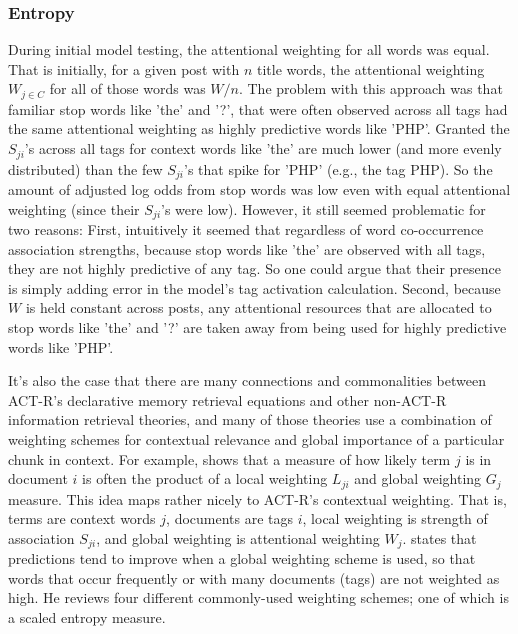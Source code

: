 \documentclass[10pt,letterpaper]{article}
\begin{document}
\subsubsection{Entropy}

During initial model testing, the attentional weighting for all words was equal.
That is initially, for a given post with $n$ title words, the attentional weighting $W_{j\in C}$ for all of those words was $W/n$.
The problem with this approach was that familiar stop words like 'the' and '?', that were often observed across all tags had the same attentional weighting as highly predictive words like 'PHP'.
Granted the $S_{ji}$'s across all tags for context words like 'the' are much lower (and more evenly distributed) than the few $S_{ji}$'s that spike for 'PHP' (e.g., the tag PHP).
So the amount of adjusted log odds from stop words was low even with equal attentional weighting (since their $S_{ji}$'s were low).
However, it still seemed problematic for two reasons:
First, intuitively it seemed that regardless of word co-occurrence association strengths, because stop words like 'the' are observed with all tags, they are not highly predictive of any tag.
So one could argue that their presence is simply adding error in the model's tag activation calculation.
Second, because $W$ is held constant across posts, any attentional resources that are allocated to stop words like 'the' and '?' are taken away from being used for highly predictive words like 'PHP'.

It's also the case that there are many connections and commonalities between ACT-R's declarative memory retrieval equations and other non-ACT-R information retrieval theories,
and many of those theories use a combination of weighting schemes for contextual relevance and global importance of a particular chunk in context.
For example,  shows that a measure of how likely term $j$ is in document $i$ is often the product of a local weighting $L_{ji}$ and global weighting $G_{j}$ measure.
This idea maps rather nicely to ACT-R's contextual weighting.
That is, terms are context words $j$, documents are tags $i$, local weighting is strength of association $S_{ji}$, and global weighting is attentional weighting $W_{j}$.
 states that predictions tend to improve when a global weighting scheme is used, so that words that occur frequently or with many documents (tags) are not weighted as high.
He reviews four different commonly-used weighting schemes; one of which is a scaled entropy measure.
\end{document}
